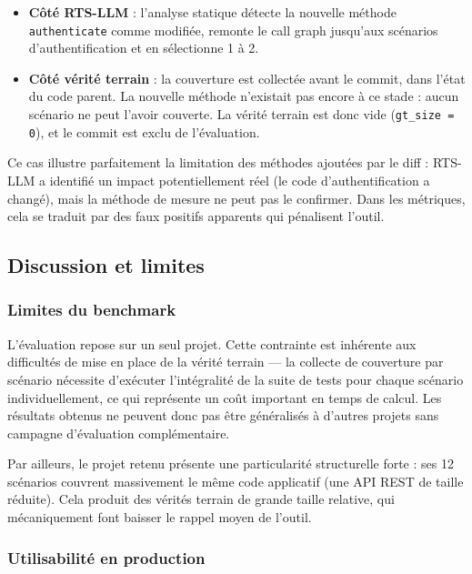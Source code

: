 \documentclass[12pt,a4paper]{article}
\begin{document}
\begin{itemize}
  \item \textbf{Côté RTS-LLM} : l'analyse statique détecte la nouvelle
        méthode \texttt{authenticate} comme modifiée, remonte le call graph
        jusqu'aux scénarios d'authentification et en sélectionne 1 à 2.

  \item \textbf{Côté vérité terrain} : la couverture est collectée avant
        le commit, dans l'état du code parent. La nouvelle méthode n'existait
        pas encore à ce stade : aucun scénario ne peut l'avoir couverte.
        La vérité terrain est donc vide (\texttt{gt\_size = 0}), et le
        commit est exclu de l'évaluation.
\end{itemize}

Ce cas illustre parfaitement la limitation des méthodes ajoutées par le
diff : RTS-LLM a identifié un impact potentiellement réel (le code
d'authentification a changé), mais la méthode de mesure ne peut pas le
confirmer. Dans les métriques, cela se traduit par des faux positifs
apparents qui pénalisent l'outil.

\subsection{Discussion et limites}

\subsubsection{Limites du benchmark}

L'évaluation repose sur un seul projet. Cette contrainte est inhérente
aux difficultés de mise en place de la vérité terrain --- la collecte
de couverture par scénario nécessite d'exécuter l'intégralité de la
suite de tests pour chaque scénario individuellement, ce qui représente
un coût important en temps de calcul. Les résultats obtenus ne peuvent
donc pas être généralisés à d'autres projets sans campagne d'évaluation
complémentaire.

Par ailleurs, le projet retenu présente une particularité structurelle
forte : ses 12 scénarios couvrent massivement le même code applicatif
(une API REST de taille réduite). Cela produit des vérités terrain de
grande taille relative, qui mécaniquement font baisser le rappel moyen
de l'outil.

\subsubsection{Utilisabilité en production}
\end{document}
